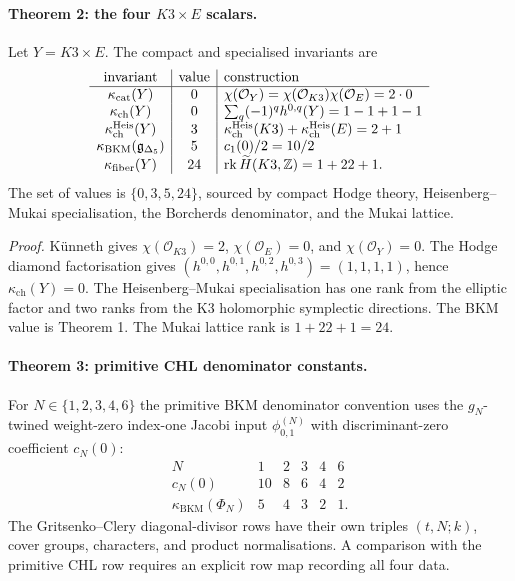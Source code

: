 \paragraph{Theorem 2: the four \(K3\times E\) scalars.}
Let \(Y=K3\times E\). The compact and specialised invariants are
\[
\begin{array}{c|c|l}
\text{invariant} & \text{value} & \text{construction}\\
\hline
\kappa_{\mathrm{cat}}(Y) & 0
  & \chi(\mathcal O_Y)=\chi(\mathcal O_{K3})\chi(\mathcal O_E)=2\cdot0\\
\kappa_{\mathrm{ch}}(Y) & 0
  & \sum_q(-1)^q h^{0,q}(Y)=1-1+1-1\\
\kappa_{\mathrm{ch}}^{\mathrm{Heis}}(Y) & 3
  & \kappa_{\mathrm{ch}}^{\mathrm{Heis}}(K3)+
    \kappa_{\mathrm{ch}}^{\mathrm{Heis}}(E)=2+1\\
\kappa_{\mathrm{BKM}}(\mathfrak{g}_{\Delta_{5}}) & 5
  & c_1(0)/2=10/2\\
\kappa_{\mathrm{fiber}}(Y) & 24
  & \operatorname{rk}\widetilde H(K3,\mathbb{Z})=1+22+1 .
\end{array}
\]
The set of values is \(\{0,3,5,24\}\), sourced by compact Hodge theory,
Heisenberg--Mukai specialisation, the Borcherds denominator, and the
Mukai lattice.

\emph{Proof.}
K\"unneth gives \(\chi(\mathcal O_{K3})=2\), \(\chi(\mathcal O_E)=0\),
and \(\chi(\mathcal O_Y)=0\). The Hodge diamond factorisation gives
\((h^{0,0},h^{0,1},h^{0,2},h^{0,3})=(1,1,1,1)\), hence
\(\kappa_{\mathrm{ch}}(Y)=0\). The Heisenberg--Mukai specialisation
has one rank from the elliptic factor and two ranks from the K3
holomorphic symplectic directions. The BKM value is Theorem 1. The
Mukai lattice rank is \(1+22+1=24\).

\paragraph{Theorem 3: primitive CHL denominator constants.}
For \(N\in\{1,2,3,4,6\}\) the primitive BKM denominator convention uses
the \(g_N\)-twined weight-zero index-one Jacobi input
\(\phi_{0,1}^{(N)}\) with discriminant-zero coefficient \(c_N(0)\):
\[
\begin{array}{c|ccccc}
N & 1 & 2 & 3 & 4 & 6\\
\hline
c_N(0) & 10 & 8 & 6 & 4 & 2\\
\kappa_{\mathrm{BKM}}(\Phi_N) & 5 & 4 & 3 & 2 & 1 .
\end{array}
\]
The Gritsenko--Clery diagonal-divisor rows have their own triples
\((t,N;k)\), cover groups, characters, and product normalisations. A
comparison with the primitive CHL row requires an explicit row map
recording all four data.


